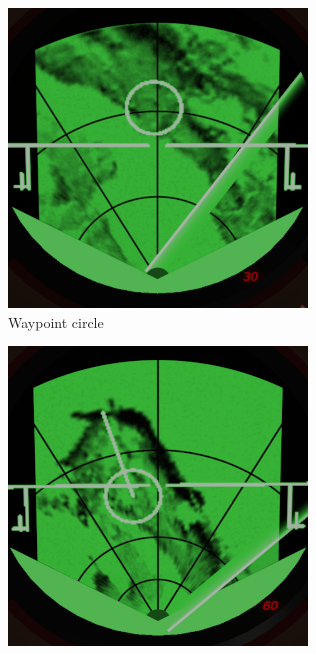 \begin{figure}[!ht]
  \centering
  \begin{subfigure}[t]{0.3\textwidth}
    \includegraphics[width=\textwidth]{images/displays/CI-waypoint.png}
    \caption{Waypoint circle}
    \label{fig:CI-navigation-waypoint}
  \end{subfigure}
  \begin{subfigure}[t]{0.3\textwidth}
    \includegraphics[width=\textwidth]{images/displays/CI-runway.png}

\end{subfigure}
\end{figure}
